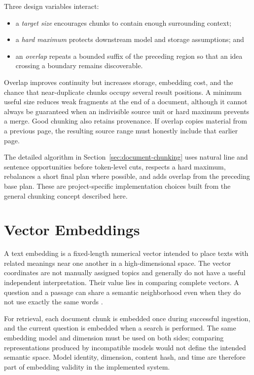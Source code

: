 Three design variables interact:

\begin{itemize}
    \item a \emph{target size} encourages chunks to contain enough surrounding context;
    \item a \emph{hard maximum} protects downstream model and storage assumptions; and
    \item an \emph{overlap} repeats a bounded suffix of the preceding region so that an idea crossing a boundary remains discoverable.
\end{itemize}

Overlap improves continuity but increases storage, embedding cost, and the chance that near-duplicate chunks occupy several result positions. A minimum useful size reduces weak fragments at the end of a document, although it cannot always be guaranteed when an indivisible source unit or hard maximum prevents a merge. Good chunking also retains provenance. If overlap copies material from a previous page, the resulting source range must honestly include that earlier page.

The detailed algorithm in Section~\ref{sec:document-chunking} uses natural line and sentence opportunities before token-level cuts, respects a hard maximum, rebalances a short final plan where possible, and adds overlap from the preceding base plan. These are project-specific implementation choices built from the general chunking concept described here.

\section{Vector Embeddings}
\label{sec:background-embeddings}

A text embedding is a fixed-length numerical vector intended to place texts with related meanings near one another in a high-dimensional space. The vector coordinates are not manually assigned topics and generally do not have a useful independent interpretation. Their value lies in comparing complete vectors. A question and a passage can share a semantic neighborhood even when they do not use exactly the same words \cite{Karpukhin2020DPR,OpenAIEmbeddingModel}.

For retrieval, each document chunk is embedded once during successful ingestion, and the current question is embedded when a search is performed. The same embedding model and dimension must be used on both sides; comparing representations produced by incompatible models would not define the intended semantic space. Model identity, dimension, content hash, and time are therefore part of embedding validity in the implemented system.

